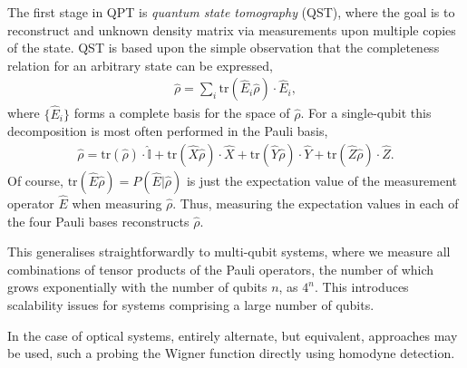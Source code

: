 \documentclass[aps,rmp,twocolumn,amsmath,amssymb,nofootinbib,superscriptaddress,longbibliography,floatfix]{revtex4-1}
\begin{document}
The first stage in QPT is \emph{quantum state tomography} (QST), where the goal is to reconstruct and unknown density matrix via measurements upon multiple copies of the state. QST is based upon the simple observation that the completeness relation for an arbitrary state can be expressed,
\begin{align}
\hat\rho = \sum_i \mathrm{tr}(\hat{E}_i\hat\rho)\cdot\hat{E}_i,
\end{align}
where $\{\hat{E}_i\}$ forms a complete basis for the space of $\hat\rho$. For a single-qubit this decomposition is most often performed in the Pauli basis, 
\begin{align}
\hat\rho = \mathrm{tr}(\hat\rho)\cdot\hat{\mathbb{I}} + \mathrm{tr}(\hat{X}\hat\rho)\cdot\hat{X} + \mathrm{tr}(\hat{Y}\hat\rho)\cdot\hat{Y} +\mathrm{tr}(\hat{Z}\hat\rho)\cdot\hat{Z}.
\end{align}
Of course, \mbox{$\mathrm{tr}(\hat{E}\hat\rho) = P(\hat{E}|\hat\rho)$} is just the expectation value of the measurement operator $\hat{E}$ when measuring $\hat\rho$. Thus, measuring the expectation values in each of the four Pauli bases reconstructs $\hat\rho$.

This generalises straightforwardly to multi-qubit systems, where we measure all combinations of tensor products of the Pauli operators, the number of which grows exponentially with the number of qubits $n$, as $4^n$. This introduces scalability issues for systems comprising a large number of qubits.

In the case of optical systems, entirely alternate, but equivalent, approaches may be used, such a probing the Wigner function directly using homodyne detection.
\end{document}
